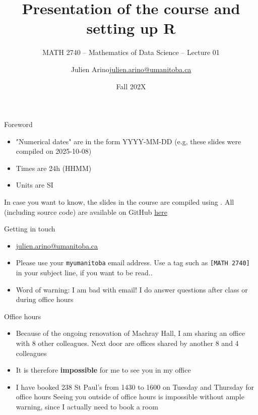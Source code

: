 \documentclass[aspectratio=169]{beamer}\usepackage[]{graphicx}\usepackage[]{xcolor}
\subtitle{MATH 2740 -- Mathematics of Data Science -- Lecture 01}
\author{\texorpdfstring{Julien Arino\newline\url{julien.arino@umanitoba.ca}}{Julien Arino}}
\institute{Department of Mathematics @ University of Manitoba}
\date{Fall 202X}
\title{Presentation of the course and setting up R}
\begin{document}





\begin{frame}{Foreword}
\begin{itemize}
\item "Numerical dates" are in the form YYYY-MM-DD (e.g, these slides were compiled on 2025-10-08)
\vfill
\item Times are 24h (HHMM)
\vfill
\item Units are SI
\end{itemize}
\vfill
In case you want to know, the slides in the course are  compiled using . All (including source code) are available on GitHub \href{https://github.com/julien-arino/math2740-of-data-science}{here}
\end{frame}

\begin{frame}{Getting in touch}
\begin{itemize}
\item \href{mailto:julien.arino@umanitoba.ca}{julien.arino@umanitoba.ca}
\vfill
\item Please use your \texttt{myumanitoba} email address. Use a tag such as \texttt{[MATH 2740]} in your subject line, if you want to be read..
\vfill
\item Word of warning: I am bad with email! I do answer questions after class or during office hours
\end{itemize}
\end{frame}

\begin{frame}{Office hours}
\begin{itemize}
\item Because of the ongoing renovation of Machray Hall, I am sharing an office with 8 other colleagues. Next door are offices shared by another 8 and 4 colleagues
\vfill
\item It is therefore \textbf{impossible} for me to see you in my office
\vfill
\item I have booked 238 St Paul's from 1430 to 1600 on Tuesday and Thursday for office hours
\vfill
Seeing you outside of office hours is impossible without ample warning, since I actually need to book a room
\end{itemize}
\end{frame}
\end{document}
